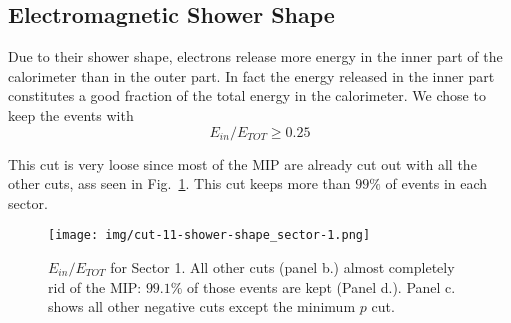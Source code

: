 

\subsection{Electromagnetic Shower Shape}
Due to their shower shape, electrons release more energy in 
the inner part of the calorimeter than in the outer part. In
fact the energy released in the inner part constitutes a good
fraction of the total energy in the calorimeter.
We chose to keep the events with $$E_{in}/E_{TOT} \geq 0.25$$

This cut is very loose since most of the MIP are already cut
out with all the other cuts, ass seen in Fig.~\ref{fig:einetot}.
This cut keeps more than $99\%$ of events in each sector.


\begin{figure}[ht]
  \centering
		\texttt{[image: img/cut-11-shower-shape\_sector-1.png]}
		\caption{$E_{in}/E_{TOT}$ for Sector 1. All other cuts (panel b.)
					almost completely rid of the MIP: $99.1\%$ of those events are kept (Panel d.). 
					Panel c. shows all other negative cuts except the minimum $p$ cut.}
 		\label{fig:einetot}
\end{figure}

